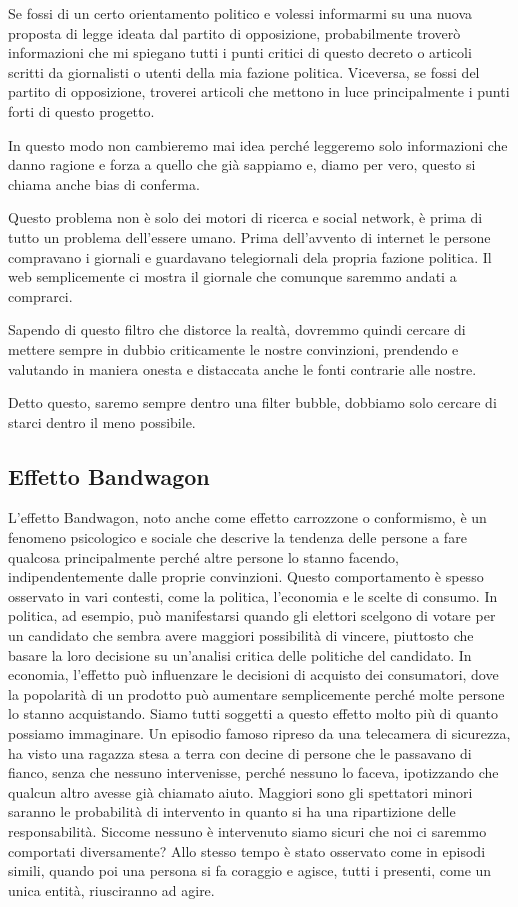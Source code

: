 \documentclass[12pt]{book} %
\begin{document}
Se fossi di un certo orientamento politico e volessi informarmi su una nuova proposta di legge ideata dal partito di
opposizione, probabilmente troverò informazioni che mi spiegano tutti i punti critici di questo decreto o articoli
scritti da giornalisti o utenti della mia fazione politica. Viceversa, se fossi del partito di opposizione, troverei
articoli che mettono in luce principalmente i punti forti di questo progetto.

In questo modo non cambieremo mai idea perché leggeremo solo informazioni che danno ragione e forza a quello che già
sappiamo e, diamo per vero, questo si chiama anche bias di conferma.

Questo problema non è solo dei motori di ricerca e social network, è prima di tutto un problema
dell'essere umano. Prima dell'avvento di internet le persone compravano i
giornali e guardavano telegiornali dela propria fazione politica. Il web semplicemente ci mostra il giornale che
comunque saremmo andati a comprarci.

Sapendo di questo filtro che distorce la realtà, dovremmo quindi cercare di mettere sempre in dubbio criticamente le
nostre convinzioni, prendendo e valutando in maniera onesta e distaccata anche le fonti contrarie alle nostre.

Detto questo, saremo sempre dentro una filter bubble, dobbiamo solo cercare di starci dentro il meno possibile.


\bigskip

\subsection{Effetto Bandwagon}
L'effetto Bandwagon, noto anche come effetto carrozzone o conformismo, è un fenomeno psicologico e
sociale che descrive la tendenza delle persone a fare qualcosa principalmente perché altre persone lo stanno facendo,
indipendentemente dalle proprie convinzioni. Questo comportamento è spesso osservato in vari contesti, come la
politica, l'economia e le scelte di consumo. In politica, ad esempio, può manifestarsi quando gli
elettori scelgono di votare per un candidato che sembra avere maggiori possibilità di vincere, piuttosto che basare la
loro decisione su un'analisi critica delle politiche del candidato. In economia,
l'effetto può influenzare le decisioni di acquisto dei consumatori, dove la popolarità di un
prodotto può aumentare semplicemente perché molte persone lo stanno acquistando. Siamo tutti soggetti a questo effetto
molto più di quanto possiamo immaginare. Un episodio famoso ripreso da una telecamera di sicurezza, ha visto una
ragazza stesa a terra con decine di persone che le passavano di fianco, senza che nessuno intervenisse, perché nessuno
lo faceva, ipotizzando che qualcun altro avesse già chiamato aiuto. Maggiori sono gli spettatori minori saranno le
probabilità di intervento in quanto si ha una ripartizione delle responsabilità. Siccome nessuno è intervenuto siamo
sicuri che noi ci saremmo comportati diversamente? Allo stesso tempo è stato osservato come in episodi simili, quando
poi una persona si fa coraggio e agisce, tutti i presenti, come un unica entità, riusciranno ad agire.
\end{document}
